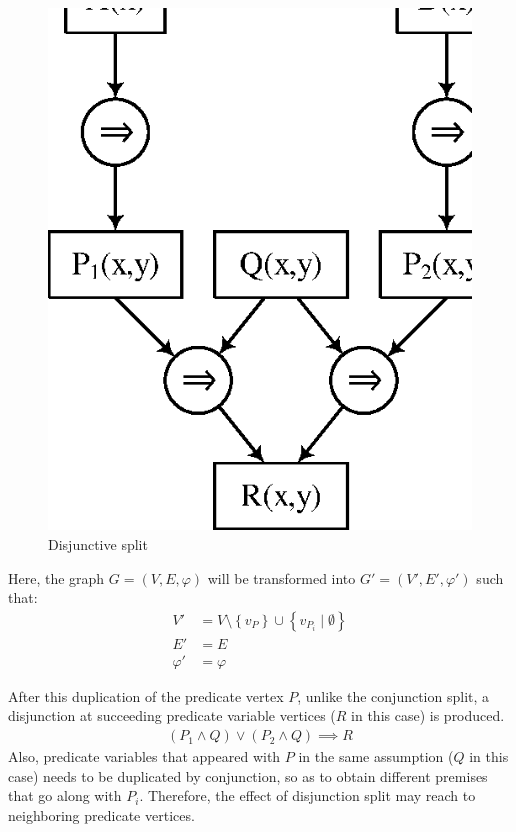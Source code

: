 \begin{figure}[htb]
\begin{minipage}[t]{.47\textwidth}
  \includegraphics[scale=0.8]{figures/disj2.eps}
  \end{minipage}
  \caption{Disjunctive split}
  \label{fig:disj1}
\end{figure}

Here, the graph $G=(V,E,\varphi)$ will be transformed into
$G'=(V',E',\varphi')$ such that:
\begin{align*}
V' & = V \setminus \left\lbrace v_P \right\rbrace \cup
  \left\lbrace v_{P_i} \mid \emptyset \right\rbrace \\
E' & = E \\
\varphi' & = \varphi
\end{align*}

After this duplication of the predicate vertex $P$, unlike the
conjunction split, a disjunction at succeeding predicate
variable vertices ($R$ in this case) is produced.
\begin{align*}
(P_1 \wedge Q) \vee (P_2 \wedge Q) \implies R
\end{align*}
Also, predicate variables that appeared with $P$ in the same
assumption ($Q$ in this case) needs to be duplicated by conjunction,
so as to obtain different premises that go along with $P_i$.
Therefore, the effect of disjunction split may reach to neighboring
predicate vertices.



